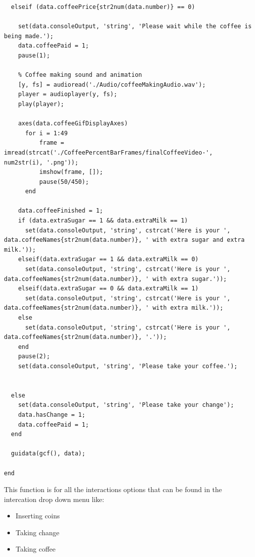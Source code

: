 \documentclass[a4paper, 10pt]{article}
\begin{document}
\begin{lstlisting}
  elseif (data.coffeePrice{str2num(data.number)} == 0)

    set(data.consoleOutput, 'string', 'Please wait while the coffee is being made.');
    data.coffeePaid = 1;
    pause(1);

    % Coffee making sound and animation
    [y, fs] = audioread('./Audio/coffeeMakingAudio.wav');
    player = audioplayer(y, fs);
    play(player);

    axes(data.coffeeGifDisplayAxes)
	  for i = 1:49
		  frame = imread(strcat('./CoffeePercentBarFrames/finalCoffeeVideo-', num2str(i), '.png'));
		  imshow(frame, []);
		  pause(50/450);
	  end

    data.coffeeFinished = 1;
    if (data.extraSugar == 1 && data.extraMilk == 1)
      set(data.consoleOutput, 'string', cstrcat('Here is your ', data.coffeeNames{str2num(data.number)}, ' with extra sugar and extra milk.'));
    elseif(data.extraSugar == 1 && data.extraMilk == 0)
      set(data.consoleOutput, 'string', cstrcat('Here is your ', data.coffeeNames{str2num(data.number)}, ' with extra sugar.'));
    elseif(data.extraSugar == 0 && data.extraMilk == 1)
      set(data.consoleOutput, 'string', cstrcat('Here is your ', data.coffeeNames{str2num(data.number)}, ' with extra milk.'));
    else
      set(data.consoleOutput, 'string', cstrcat('Here is your ', data.coffeeNames{str2num(data.number)}, '.'));
    end
    pause(2);
    set(data.consoleOutput, 'string', 'Please take your coffee.');


  else
    set(data.consoleOutput, 'string', 'Please take your change');
    data.hasChange = 1;
    data.coffeePaid = 1;
  end

  guidata(gcf(), data);

end
			\end{lstlisting}

			\noindent This function is for all the interactions options that can be found in the intercation drop down menu like:
			\begin{itemize}
				\item Inserting coins
				\item Taking change
				\item Taking coffee 
			\end{itemize}
\end{document}
